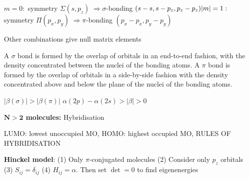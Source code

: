 \begin{squishlist}
    \item
    \begin{minipage}{0.7\columnwidth}
        $m=0 : $ symmetry $ \Sigma (s, p_z) \;  \Longrightarrow \sigma$-bonding $(s-s, s-p_z, p_z-p_z) \\
        |m|=1 : $ symmetry $ \Pi (p_x, p_y) \; \Longrightarrow \pi$-bonding $(p_x-p_x, p_y-p_y)$
    \end{minipage}
    \vline
    \hspace{0.05cm}
    \begin{minipage}{0.3\columnwidth}
        Other combinations give null matrix elements
    \end{minipage}
    \item A $\sigma$ bond is formed by the overlap of orbitals in an end-to-end fashion, with the \elec density concentrated between the nuclei of the bonding atoms. A $\pi$  bond is formed by the overlap of orbitals in a side-by-side fashion with the \elec density concentrated above and below the plane of the nuclei of the bonding atoms.
    \item $|\beta(\sigma)| > |\beta(\pi)|$ \qquad $\alpha(2p) - \alpha(2s) > |\beta| > 0$
\end{squishlist}

\squishline

\begin{squishlist}
    \item \textbf{$\mathbf{N>2}$ molecules:} Hybridisation
    \item LUMO: lowest unoccupied MO, HOMO: highest occupied MO, RULES OF HYBRIDISATION
    \item \textbf{Hinckel model}: (1) Only $\pi$-conjugated molecules (2) Consider only $p_z$ orbitals (3) $S_{ij} = \delta_{ij}$ (4) $H_{ij} = \alpha$. \quad Then set $\det =0$ to find eigenenergies
\end{squishlist}


